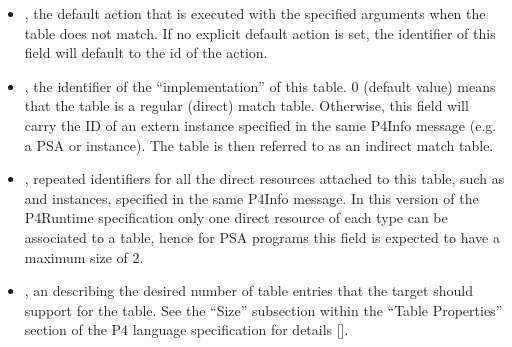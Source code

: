 \documentclass[11pt]{article}
\begin{document}
{\begin{itemize}
\item{}
, the default action that is executed with the
 specified arguments when the table does not match.  If no explicit
 default action is set, the identifier of this field will default to
 the id of the  action.%

\item{}
, the  identifier of the \textquotedblleft{}implementation\textquotedblright{} of this
table. 0 (default value) means that the table is a regular (direct) match
table. Otherwise, this field will carry the ID of an extern instance specified
in the same P4Info message (e.g. a PSA  or 
instance). The table is then referred to as an indirect match table.%

\item{}
, repeated  identifiers for all the direct
resources attached to this table, such as  and 
instances, specified in the same P4Info message. In this version of the
P4Runtime specification only one direct resource of each type can be
associated to a table, hence for PSA programs this field is expected to have a
maximum size of 2.%

\item{}
, an  describing the desired number of table entries that the
target should support for the table.  See the \textquotedblleft{}Size\textquotedblright{} subsection within the
\textquotedblleft{}Table Properties\textquotedblright{} section of the P4 language specification for details
[].%


\end{itemize}}
\end{document}
